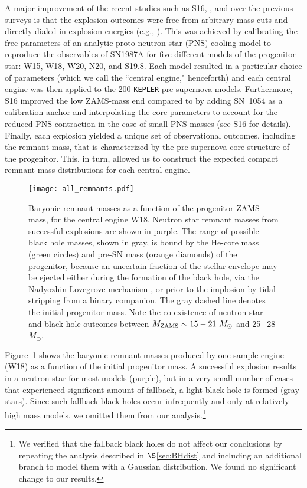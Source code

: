 \documentclass[]{emulateapj}
\newcommand{\Ms}{M_{\odot}}
\newcommand{\Mz}{M_{\rm ZAMS}}
\begin{document}
A major improvement of the recent studies such as S16, \citet{Ugliano2012}, and \citet{Ertl2016} over the previous surveys is that the explosion outcomes were free from arbitrary mass cuts and directly dialed-in explosion energies (e.g., \citealt{Woosley2002, Chieffi2013, Nomoto2013}). This was achieved by calibrating the free parameters of an analytic proto-neutron star (PNS) cooling model to reproduce the observables of SN1987A for five different models of the progenitor star: W15, W18, W20, N20, and S19.8. Each model resulted in a particular choice of parameters (which we call the ``central engine," henceforth) and each central engine was then applied to the 200 \texttt{KEPLER} pre-supernova models. Furthermore, S16 improved the low ZAMS-mass end compared to \citet{Ugliano2012} by adding SN~1054 as a calibration anchor and interpolating the core parameters to account for the reduced PNS contraction in the case of small PNS masses (see S16 for details). Finally, each explosion yielded a unique set of observational outcomes, including the remnant mass, that is characterized by the pre-supernova core structure of the progenitor. This, in turn, allowed us to construct the expected compact remnant mass distributions for each central engine.

\begin{figure}[ht]
\centering
\texttt{[image: all\_remnants.pdf]}
\caption{\label{fig:allrem} Baryonic remnant masses as a function of the progenitor ZAMS mass, for the central engine W18. Neutron star remnant masses from successful explosions are shown in purple. The range of possible black hole masses, shown in gray, is bound by the He-core mass (green circles) and pre-SN mass (orange diamonds) of the progenitor, because an uncertain fraction of the stellar envelope may be ejected either during the formation of the black hole, via the Nadyozhin-Lovegrove mechanism \citep{Nadezhin1980, Lovegrove2013}, or prior to the implosion by tidal stripping from a binary companion. The gray dashed line denotes the initial progenitor mass. Note the co-existence of neutron star and black hole outcomes between $\Mz \sim15-21~\Ms$ and 25$-$28$\Ms$.}
\end{figure}

Figure~\ref{fig:allrem} shows the baryonic remnant masses produced by one sample engine (W18) as a function of the initial progenitor mass. A successful explosion results in a neutron star for most models (purple), but in a very small number of cases that experienced significant amount of fallback, a light black hole is formed (gray stars). Since such fallback black holes occur infrequently and only at relatively high mass models, we omitted them from our analysis.\footnote[1]{We verified that the fallback black holes do not affect our conclusions by repeating the analysis described in $\S$\ref{sec:BHdist} and including an additional branch to model them with a Gaussian distribution. We found no significant change to our results.}
\end{document}
